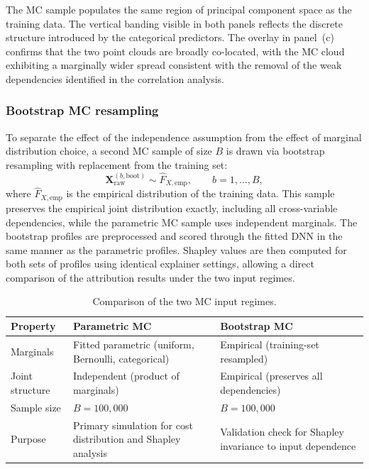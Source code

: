 \noindent
The MC sample populates the same region of principal component
space as the training data. The vertical banding visible in both panels
reflects the discrete structure introduced by the categorical predictors.
The overlay in panel~(c) confirms that the two point clouds are broadly
co-located, with the MC cloud exhibiting a marginally wider spread
consistent with the removal of the weak dependencies identified in the
correlation analysis.

\subsubsection{Bootstrap MC resampling}
\label{sec:bootstrap_mc_resampling}

To separate the effect of the independence assumption from the effect of
marginal distribution choice, a second MC sample of size $B$ is
drawn via bootstrap resampling with replacement from the training set:
\begin{equation}
    \mathbf{X}_{\mathrm{raw}}^{(b,\mathrm{boot})}
    \sim
    \widehat{F}_{X,\mathrm{emp}},
    \qquad
    b = 1, \ldots, B,
    \label{eq:bootstrap_mc_ch3}
\end{equation}
where $\widehat{F}_{X,\mathrm{emp}}$ is the empirical distribution of the
training data. This sample preserves the empirical joint distribution
exactly, including all cross-variable dependencies, while the parametric MC
sample uses independent marginals. The bootstrap profiles are preprocessed
and scored through the fitted DNN in the same manner as the
parametric profiles. Shapley values are then computed for both sets of
profiles using identical explainer settings, allowing a direct comparison of
the attribution results under the two input regimes.

\begin{table}[H]
\centering
\small
\renewcommand{\arraystretch}{1.15}
\begin{tabular}{p{}p{}p{}}
\toprule
\textbf{Property} & \textbf{Parametric MC} & \textbf{Bootstrap MC} \\
\midrule
Marginals &
Fitted parametric (uniform, Bernoulli, categorical) &
Empirical (training-set resampled) \\

Joint structure &
Independent (product of marginals) &
Empirical (preserves all dependencies) \\

Sample size &
$B = 100{,}000$ &
$B = 100{,}000$ \\

Purpose &
Primary simulation for cost distribution and Shapley analysis &
Validation check for Shapley invariance to input dependence \\
\bottomrule
\end{tabular}
\caption{Comparison of the two MC input regimes.}
\label{tab:mc_input_regimes_ch3}
\end{table}

